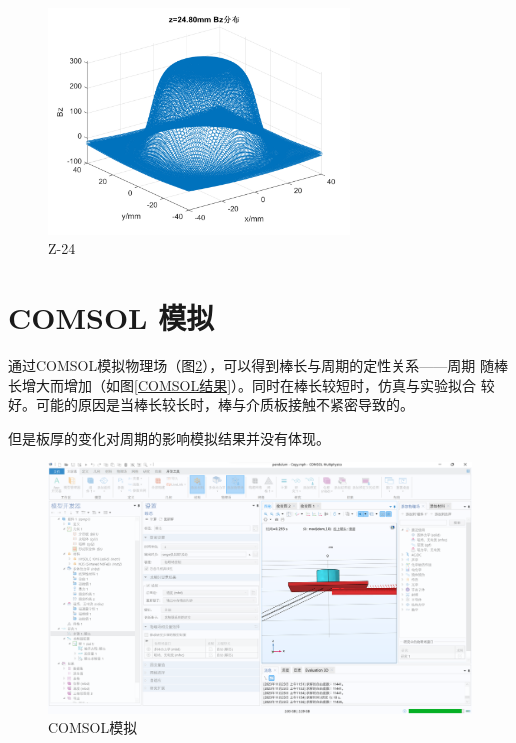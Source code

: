 \documentclass[AutoFakeBold]{LZUThesis}
\begin{document}
\begin{figure}[H]
    \centering
    \includegraphics[width=8cm]{figures/z24.png}
    \caption{Z-24}
    \label{z24}
\end{figure}

\section{COMSOL 模拟}
通过COMSOL模拟物理场（图\ref{COMSOL}），可以得到棒长与周期的定性关系——周期
随棒长增大而增加（如图\ref{COMSOL结果}）。同时在棒长较短时，仿真与实验拟合
较好。可能的原因是当棒长较长时，棒与介质板接触不紧密导致的。

但是板厚的变化对周期的影响模拟结果并没有体现。


\begin{figure}[H]
    \centering
    \includegraphics[width=12cm]{figures/COMSOL.png}
    \caption{COMSOL模拟}
    \label{COMSOL}
\end{figure}
\end{document}
